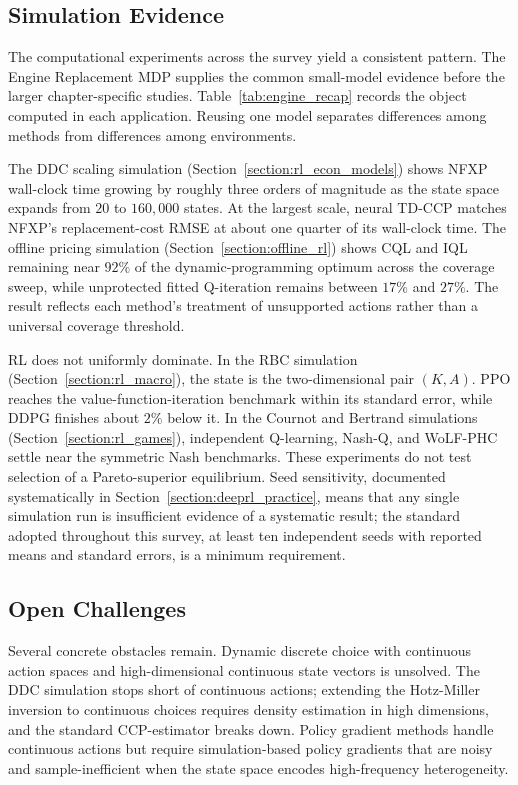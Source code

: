 \subsection{Simulation Evidence}

The computational experiments across the survey yield a consistent pattern.
The Engine Replacement MDP supplies the common small-model evidence before the larger chapter-specific studies. Table~\ref{tab:engine_recap} records the object computed in each application. Reusing one model separates differences among methods from differences among environments.

\FloatBarrier

\FloatBarrier

The DDC scaling simulation (Section~\ref{section:rl_econ_models}) shows NFXP wall-clock time growing by roughly three orders of magnitude as the state space expands from $20$ to $160{,}000$ states. At the largest scale, neural TD-CCP matches NFXP's replacement-cost RMSE at about one quarter of its wall-clock time.
The offline pricing simulation (Section~\ref{section:offline_rl}) shows CQL and IQL remaining near $92\%$ of the dynamic-programming optimum across the coverage sweep, while unprotected fitted Q-iteration remains between $17\%$ and $27\%$. The result reflects each method's treatment of unsupported actions rather than a universal coverage threshold.

RL does not uniformly dominate.
In the RBC simulation (Section~\ref{section:rl_macro}), the state is the two-dimensional pair $(K,A)$. PPO reaches the value-function-iteration benchmark within its standard error, while DDPG finishes about $2\%$ below it.
In the Cournot and Bertrand simulations (Section~\ref{section:rl_games}), independent Q-learning, Nash-Q, and WoLF-PHC settle near the symmetric Nash benchmarks. These experiments do not test selection of a Pareto-superior equilibrium.
Seed sensitivity, documented systematically in Section~\ref{section:deeprl_practice}, means that any single simulation run is insufficient evidence of a systematic result; the standard adopted throughout this survey, at least ten independent seeds with reported means and standard errors, is a minimum requirement.

\subsection{Open Challenges}

Several concrete obstacles remain.
Dynamic discrete choice with continuous action spaces and high-dimensional continuous state vectors is unsolved.
The DDC simulation stops short of continuous actions; extending the Hotz-Miller inversion \citep{HotzMiller1993} to continuous choices requires density estimation in high dimensions, and the standard CCP-estimator breaks down.
Policy gradient methods handle continuous actions but require simulation-based policy gradients that are noisy and sample-inefficient when the state space encodes high-frequency heterogeneity.

